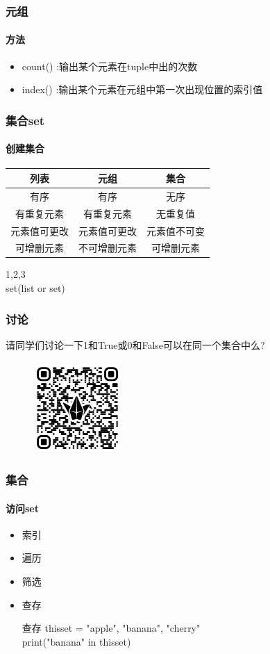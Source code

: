 \documentclass{beamer}
\begin{document}
\begin{frame}[t]
	\frametitle{元组}
	\framesubtitle{方法}
	\begin{itemize}
		\item count() :输出某个元素在tuple中出的次数
		\item index() :输出某个元素在元组中第一次出现位置的索引值
	\end{itemize}

\end{frame}
\begin{frame}[t]
	\frametitle{集合set}
	\framesubtitle{创建集合}
	\begin{table}[htpb]
		\centering
		\label{tab:label}
		\begin{tabular}{|c|c|c|}
			\hline
			列表     & 元组     & 集合     \\
			\hline
			有序     & 有序     & 无序     \\
			\hline
			有重复元素  & 有重复元素  & 无重复值   \\
			\hline
			元素值可更改 & 元素值可更改 & 元素值不可变 \\
			\hline
			可增删元素  & 不可增删元素 & 可增删元素  \\
			\hline
		\end{tabular}
	\end{table}
	\pause
	\begin{example}
		{1,2,3}\\
		set(list or set)
	\end{example}

\end{frame}
\begin{frame}[t]
	\frametitle{讨论}
	请同学们讨论一下1和True或0和False可以在同一个集合中么?

	\begin{figure}[htpb]
		\centering
		\includegraphics[width=0.3\textwidth]{discussion1.png}
		\label{fig:}
	\end{figure}
\end{frame}
\begin{frame}[t]
	\frametitle{集合}
	\framesubtitle{访问set}
	\begin{itemize}
		\item 索引
		\item 遍历
		\item 筛选
		\item 查存

		      \begin{block}{查存}
			      thisset = {"apple", "banana", "cherry"}\\
			      print("banana" in thisset)
		      \end{block}

	\end{itemize}

\end{frame}
\end{document}
